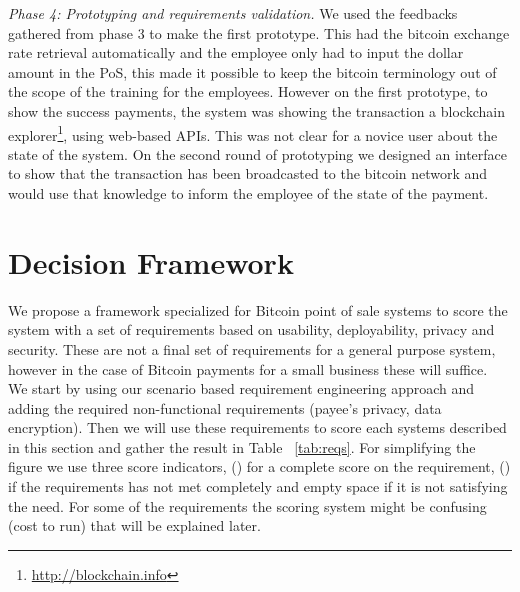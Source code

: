 \textit{Phase 4: Prototyping and requirements validation.}
We used the feedbacks gathered from phase 3 to make the first prototype. This had the bitcoin exchange rate retrieval automatically and the employee only had to input the dollar amount in the PoS, this made it possible to keep the bitcoin terminology out of the scope of the training for the employees. However on the first prototype, to show the success payments, the system was showing the transaction a blockchain explorer\footnote{\url{http://blockchain.info}}, using web-based APIs. This was not clear for a novice user about the state of the system. On the second round of prototyping we designed an interface to show that the transaction has been broadcasted to the bitcoin network and would use that knowledge to inform the employee of the state of the payment.\\

\section{Decision Framework}
We propose a framework specialized for Bitcoin point of sale systems to score the system with a set of requirements based on usability, deployability, privacy and security. These are not a final set of requirements for a general purpose system, however in the case of Bitcoin payments for a small business these will suffice.\\
We start by using our scenario based requirement engineering approach and adding the required non-functional requirements (\eg payee's privacy, data encryption). Then we will use these requirements to score each systems described in this section and gather the result in Table ~\ref{tab:reqs}. For simplifying the figure we use three score indicators,  (\full) for a complete score on the requirement, (\prt) if the requirements has not met completely and empty space if it is not satisfying the need. For some of the requirements the scoring system might be confusing (\eg cost to run) that will be explained later.

